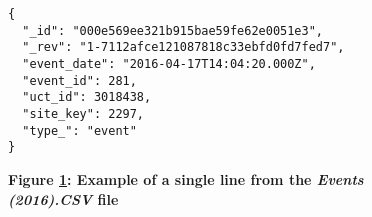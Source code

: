 \begin{figure}[H]
  \centering
  \begin{mdframed}
    \centering
    \begin{verbatim}
{
  "_id": "000e569ee321b915bae59fe62e0051e3",
  "_rev": "1-7112afce121087818c33ebfd0fd7fed7",
  "event_date": "2016-04-17T14:04:20.000Z",
  "event_id": 281,
  "uct_id": 3018438,
  "site_key": 2297,
  "type_": "event"
}           
        \end{verbatim}
  \end{mdframed}
  \caption[Event Document JSON Sample]{\textbf{Figure \ref{fig-json-event}: Example of a single line from the \textit{Events (2016).CSV} file}}
  \label{fig-json-event}
\end{figure}